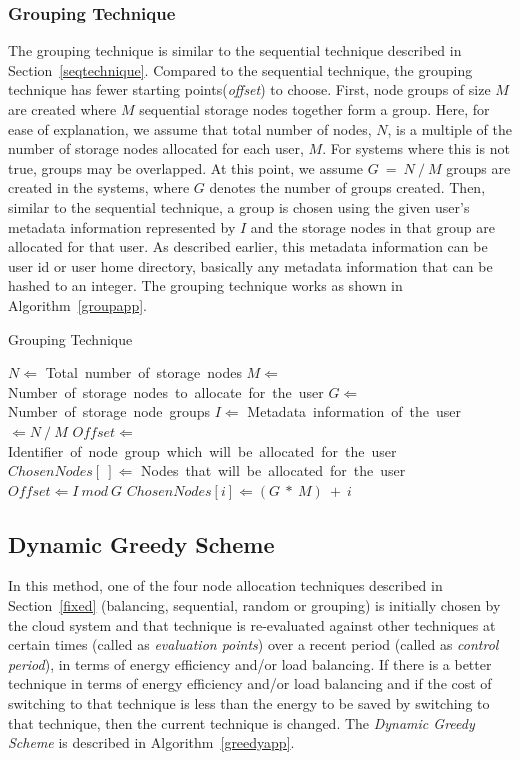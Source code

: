 \subsubsection{Grouping Technique}
The grouping technique is similar to the sequential technique described in Section~\ref{seqtechnique}.
Compared to the sequential technique, the grouping technique has fewer starting points(\textit{offset})
to choose. %
First, node groups of size $M$ are
created where $M$ sequential storage nodes together form a
group. Here, for ease of explanation, we 
assume that total number of nodes, $N$, is a multiple of the number of storage nodes allocated
for each user, $M$. For systems where this is not true, groups may be overlapped. At this point,
we assume $G\ =\ N\ /\ M$ groups are created in the systems, where $G$ denotes the number of groups created. 
Then, similar to the sequential technique, a group is chosen using the given user's metadata information
represented by $I$ and the storage nodes in that group are allocated for that user. As described
earlier, this metadata information can be user id or user home directory, basically any metadata
information that can be hashed to an integer. The grouping technique works as shown in
Algorithm~\ref{groupapp}.

\begin{algorithm}[!htbp]
\caption{Grouping Technique}
\label{groupapp}
\begin{algorithmic}[1]
    \STATE $N \Leftarrow$ Total\ number\ of\ storage\ nodes
    \STATE $M \Leftarrow$ Number\ of\ storage\ nodes\ to\ allocate\ for\ the\ user
    \STATE $G \Leftarrow$ Number\ of\ storage\ node\ groups
    \STATE $I \Leftarrow$ Metadata\ information\ of\ the\ user $\Leftarrow N\ /\ M$
    \STATE $Offset \Leftarrow$ Identifier\ of\ node\ group\ which\ will\ be\ allocated\ for\ the\ user
    \STATE $ChosenNodes[\ ] \Leftarrow$ Nodes\ that\ will\ be\ allocated\ for\ the\ user
    \STATE $Offset \Leftarrow I\ mod\ G$
        \STATE $ChosenNodes[i] \Leftarrow (G\ *\ M)\ +\ i$
    \ENDFOR
\end{algorithmic}
\end{algorithm}

\subsection{Dynamic Greedy Scheme}
\label{greedy}
In this method, one of the four node allocation techniques described in Section~\ref{fixed} (balancing,
sequential, random or grouping) is initially chosen by the cloud system and that technique is re-evaluated
against other techniques at certain times (called as \textit{evaluation points}) over a recent period (called
as \textit{control period}), in terms of energy efficiency and/or load balancing. If there is a better
technique in terms of energy efficiency and/or load balancing and if the cost of switching to that technique
is less than the energy to be saved by switching to that technique, then the current technique is changed.
The \textit{Dynamic Greedy Scheme} is described in Algorithm~\ref{greedyapp}.

